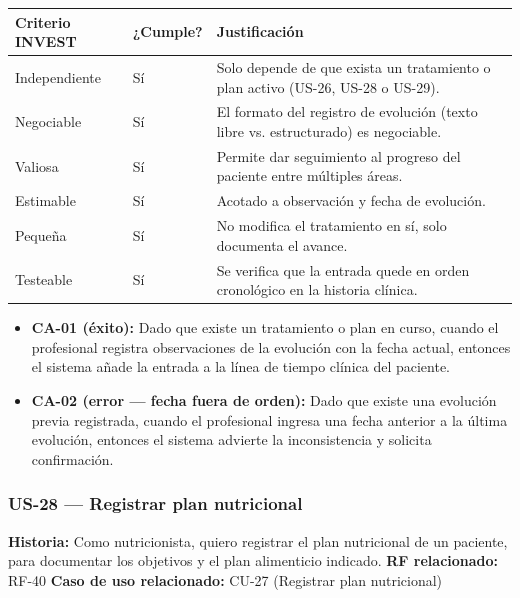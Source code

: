 \documentclass[11pt,a4paper]{article}
\providecommand{\tightlist}{%
	\setlength{\itemsep}{0pt}\setlength{\parskip}{0pt}}
\begin{document}
	\begin{longtable}{p{} p{} p{}}
		\toprule
		\textbf{Criterio INVEST} & \textbf{¿Cumple?} & \textbf{Justificación} \\
		\midrule
		\endhead
		Independiente & Sí & Solo depende de que exista un tratamiento o plan activo (US-26, US-28 o US-29). \\
		Negociable & Sí & El formato del registro de evolución (texto libre vs. estructurado) es negociable. \\
		Valiosa & Sí & Permite dar seguimiento al progreso del paciente entre múltiples áreas. \\
		Estimable & Sí & Acotado a observación y fecha de evolución. \\
		Pequeña & Sí & No modifica el tratamiento en sí, solo documenta el avance. \\
		Testeable & Sí & Se verifica que la entrada quede en orden cronológico en la historia clínica. \\
		\bottomrule
	\end{longtable}
	
	\begin{itemize}
		\tightlist
		\item \textbf{CA-01 (éxito):} Dado que existe un tratamiento o plan en curso, cuando el profesional registra observaciones de la evolución con la fecha actual, entonces el sistema añade la entrada a la línea de tiempo clínica del paciente.
		\item \textbf{CA-02 (error --- fecha fuera de orden):} Dado que existe una evolución previa registrada, cuando el profesional ingresa una fecha anterior a la última evolución, entonces el sistema advierte la inconsistencia y solicita confirmación.
	\end{itemize}
	
	\subsubsection{US-28 --- Registrar plan nutricional}
	
	\textbf{Historia:} Como nutricionista, quiero registrar el plan nutricional de un paciente, para documentar los objetivos y el plan alimenticio indicado.
	\textbf{RF relacionado:} RF-40
	\textbf{Caso de uso relacionado:} CU-27 (Registrar plan nutricional)
	
\end{document}
